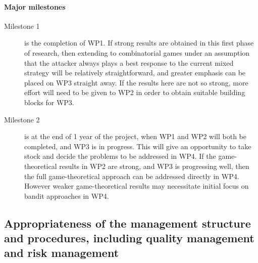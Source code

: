 \documentclass[a4paper,11pt]{article}
\newcommand{\TODO}[1]{{\textcolor{red}{[\textbf{TODO:} #1]}}}
\begin{document}

\paragraph{Major milestones}
\begin{description}
\item[Milestone 1] is the completion of WP1. If strong results are obtained in this first phase of research, then extending to combinatorial games under an assumption that the attacker always plays a best response to the current mixed strategy will be relatively straightforward, and greater emphasis can be placed on WP3 straight away.  If the results here are not so strong, more effort will need to be given to WP2 in order to obtain suitable building blocks for WP3.
\item[Milestone 2] is at the end of 1 year of the project, when WP1 and WP2 will both be completed, and WP3 is in progress. This will give an opportunity to take stock and decide the problems to be addressed in WP4. If the game-theoretical results in WP2 are strong, and WP3 is progressing well, then the full game-theoretical approach can be addressed directly in WP4.  However weaker game-theoretical results may necessitate initial focus on bandit approaches in WP4.
\end{description}

\subsection{Appropriateness of the management structure and procedures, including quality management and risk management}

\end{document}
